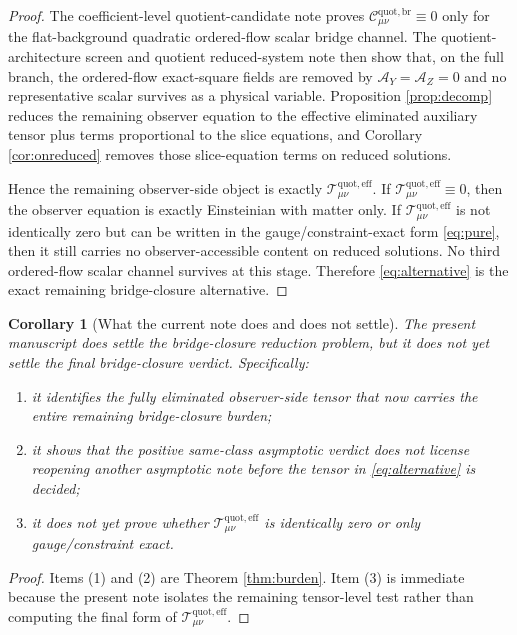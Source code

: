 \documentclass[11pt]{article}
\newcommand{\AY}{\mathcal A_Y}
\newcommand{\AZ}{\mathcal A_Z}
\newcommand{\EffAux}{\mathcal T_{\mu\nu}^{\mathrm{quot,eff}}}
\newcommand{\BridgeCorr}{\mathcal C_{\mu\nu}^{\mathrm{quot,br}}}
\newtheorem{corollary}{Corollary}
\begin{document}
\begin{proof}
The coefficient-level quotient-candidate note proves \(\BridgeCorr\equiv0\) only for the flat-background quadratic ordered-flow scalar bridge channel. The quotient-architecture screen and quotient reduced-system note then show that, on the full branch, the ordered-flow exact-square fields are removed by \(\AY=\AZ=0\) and no representative scalar survives as a physical variable. Proposition \ref{prop:decomp} reduces the remaining observer equation to the effective eliminated auxiliary tensor plus terms proportional to the slice equations, and Corollary \ref{cor:onreduced} removes those slice-equation terms on reduced solutions.

Hence the remaining observer-side object is exactly \(\EffAux\). If \(\EffAux\equiv0\), then the observer equation is exactly Einsteinian with matter only. If \(\EffAux\) is not identically zero but can be written in the gauge/constraint-exact form \eqref{eq:pure}, then it still carries no observer-accessible content on reduced solutions. No third ordered-flow scalar channel survives at this stage. Therefore \eqref{eq:alternative} is the exact remaining bridge-closure alternative.
\end{proof}

\begin{corollary}[What the current note does and does not settle]
\label{cor:scope}
The present manuscript does settle the bridge-closure reduction problem, but it does not yet settle the final bridge-closure verdict. Specifically:
\begin{enumerate}
    \item it identifies the fully eliminated observer-side tensor that now carries the entire remaining bridge-closure burden;
    \item it shows that the positive same-class asymptotic verdict does not license reopening another asymptotic note before the tensor in \eqref{eq:alternative} is decided;
    \item it does \emph{not} yet prove whether \(\EffAux\) is identically zero or only gauge/constraint exact.
\end{enumerate}
\end{corollary}

\begin{proof}
Items (1) and (2) are Theorem \ref{thm:burden}. Item (3) is immediate because the present note isolates the remaining tensor-level test rather than computing the final form of \(\EffAux\).
\end{proof}
\end{document}
